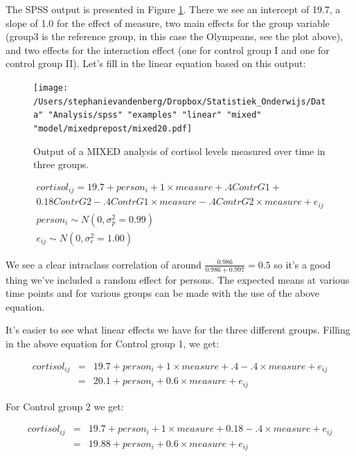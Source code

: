 \documentclass[]{book}\usepackage[]{graphicx}\usepackage[]{color}
\begin{document}
The SPSS output is presented in Figure \ref{fig:mixed20}. There we see an intercept of 19.7, a slope of 1.0 for the effect of measure, two main effects for the group variable (group3 is the reference group, in this case the Olympeans, see the plot above), and two effects for the interaction effect (one for control group I and one for control group II). Let's fill in the linear equation based on this output:



\begin{figure}[h]
    \begin{center}
       \texttt{[image: /Users/stephanievandenberg/Dropbox/Statistiek\_Onderwijs/Data" "Analysis/spss" "examples" "linear" "mixed" "model/mixedprepost/mixed20.pdf]}
    \end{center}
    \label{fig:mixed20}
    \caption{Output of a MIXED analysis of cortisol levels measured over time in three groups.}
\end{figure}



\begin{eqnarray}
cortisol_{ij} = 19.7 + person_i + 1 \times measure + .4  ContrG1 + \nonumber\\
      0.18 ContrG2 -.4  ContrG1 \times measure -.4  ContrG2 \times measure+   e_{ij} \nonumber\\
person_i \sim N(0, \sigma_p^2 = 0.99)\nonumber\\
e_{ij} \sim N(0, \sigma_e^2 = 1.00) \nonumber
\end{eqnarray}

We see a clear intraclass correlation of around $\frac{0.986}{0.986+0.997}= 0.5 $ so it's a good thing we've included a random effect for persons. The expected means at various time points and for various groups can be made with the use of the above equation. 

It's easier to see what linear effects we have for the three different groups. Filling in the above equation for Control group 1, we get:

\begin{eqnarray}
cortisol_{ij} &=& 19.7 + person_i + 1 \times measure + .4    -.4  \times measure +   e_{ij} \nonumber \\
               &=&  20.1 + person_i +0.6 \times measure +   e_{ij} \nonumber
\end{eqnarray}

For Control group 2 we get:

\begin{eqnarray}
cortisol_{ij} &=& 19.7 + person_i + 1 \times measure  + 0.18  - .4  \times measure+   e_{ij} \nonumber \\
        &=&   19.88 + person_i   + 0.6 \times measure    +   e_{ij}    \nonumber
\end{eqnarray}
\end{document}
